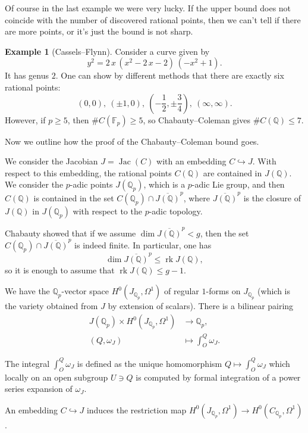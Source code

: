 \documentclass{article}
\theoremstyle{definition}
\newtheorem{example}[proposition]{Example}
\DeclareMathOperator{\rk}{rk}
\DeclareMathOperator{\Jac}{Jac}
\newcommand{\FF}{\mathbb{F}}
\newcommand{\QQ}{\mathbb{Q}}
\begin{document}
Of course in the last example we were very lucky. If the upper bound does not
coincide with the number of discovered rational points, then we can't tell if
there are more points, or it's just the bound is not sharp.

\begin{example}[Cassels--Flynn]
  Consider a curve given by
  $$y^2 = 2\,x \, (x^2 - 2\,x - 2) \, (-x^2 + 1).$$
  It has genus $2$. One can show by different methods that there are exactly six rational points:
  $$(0,0), ~ (\pm 1,0), ~ \left(-\frac{1}{2}, \pm \frac{3}{4}\right), ~ (\infty,\infty).$$
  However, if $p \ge 5$, then $\# C (\FF_p) \ge 5$, so Chabauty--Coleman gives
  $\# C (\QQ) \le 7$.
\end{example}

\vspace{1em}

Now we outline how the proof of the Chabauty--Coleman bound goes.

We consider the Jacobian $J = \Jac (C)$ with an embedding $C \hookrightarrow
J$. With respect to this embedding, the rational points $C (\QQ)$ are contained
in $J (\QQ)$. We consider the $p$-adic points $J (\QQ_p)$, which is a $p$-adic
Lie group, and then $C (\QQ)$ is contained in the set
$C (\QQ_p) \cap \overline{J (\QQ)}^p$, where $\overline{J (\QQ)}^p$ is the
closure of $J (\QQ)$ in $J (\QQ_p)$ with respect to the $p$-adic topology.

Chabauty showed that if we assume $\dim \overline{J (\QQ)}^p < g$, then the set
$C (\QQ_p) \cap \overline{J (\QQ)}^p$ is indeed finite. In particular, one has
$$\dim \overline{J (\QQ)}^p \le \rk J (\QQ),$$
so it is enough to assume that $\rk J (\QQ) \le g - 1$.

We have the $\QQ_p$-vector space $H^0 (J_{\QQ_p}, \Omega^1)$ of regular
$1$-forms on $J_{\QQ_p}$ (which is the variety obtained from $J$ by extension of
scalars). There is a bilinear pairing
\begin{align*}
  J (\QQ_p) \times H^0 (J_{\QQ_p}, \Omega^1) & \to \QQ_p,\\
  (Q, \omega_J) & \mapsto \int_O^Q \omega_J.
\end{align*}

The integral $\int_O^Q \omega_J$ is defined as the unique homomorphism
$Q \mapsto \int_O^Q \omega_J$ which locally on an open subgroup $U \ni Q$ is
computed by formal integration of a power series expansion of $\omega_J$.

An embedding $C \hookrightarrow J$ induces the restriction map
$H^0 (J_{\QQ_p}, \Omega^1) \to H^0 (C_{\QQ_p}, \Omega^1)$.
\end{document}
